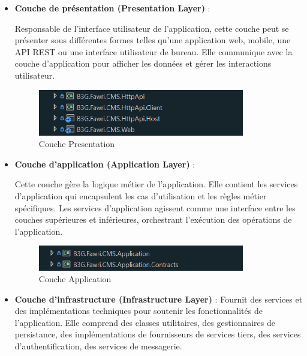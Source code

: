 \begin{itemize}
    \item \textbf{Couche de présentation (Presentation Layer)} :

Responsable de l'interface utilisateur de l'application, cette couche peut se présenter sous différentes formes telles qu'une application web, mobile, une API REST ou une interface utilisateur de bureau. Elle communique avec la couche d'application pour afficher les données et gérer les interactions utilisateur.\\

\begin{figure}[H] 
    \centering
    \includegraphics[width=9cm]{Figures/presentation layer.PNG}
        \caption{Couche Presentation}
\end{figure}

    \item \textbf{Couche d'application (Application Layer)} :

    Cette couche gère la logique métier de l'application. Elle contient les services d'application qui encapsulent les cas d'utilisation et les règles métier spécifiques. Les services d'application agissent comme une interface entre les couches supérieures et inférieures, orchestrant l'exécution des opérations de l'application.



\begin{figure}[H] 
    \centering
    \includegraphics[width=9cm]{Figures/application layer.PNG}
        \caption{Couche Application}
\end{figure}





    \item \textbf{Couche d'infrastructure (Infrastructure Layer)} :
    Fournit des services et des implémentations techniques pour soutenir les fonctionnalités de l'application. Elle comprend des classes utilitaires, des gestionnaires de persistance, des implémentations de fournisseurs de services tiers, des services d'authentification, des services de messagerie.


\end{itemize}
